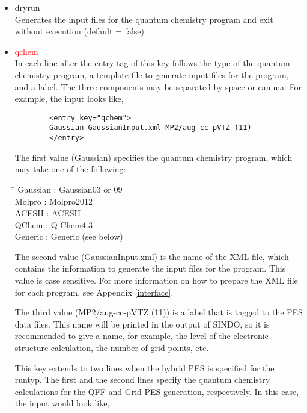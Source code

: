 \documentclass[a4paper,12pt]{article}
\begin{document}
\begin{itemize}
     \item dryrun \\
       Generates the input files for the quantum chemistry program and exit without execution (default = false) 
     \item \textcolor{red}{qchem} \\
       In each line after the entry tag of this key follows the type of the quantum chemistry program, a template 
       file to generate input files for the program, and a label. The three
       components may be separated by space or camma. For example, the input looks like,
       \begin{verbatim}
        <entry key="qchem">
        Gaussian GaussianInput.xml MP2/aug-cc-pVTZ (11)
        </entry> \end{verbatim}
       The first value (Gaussian) specifies the quantum chemistry program, which may take one of the following:
         \begin{tabbing}
           \hspace{20mm} \= \hspace{30mm} \kill
             Gaussian    \> : Gaussian03 or 09\\
             Molpro      \> : Molpro2012\\
             ACESII      \> : ACESII\\
             QChem       \> : Q-Chem4.3 \\
             Generic     \> : Generic (see below)
         \end{tabbing}      
       
       The second value (GaussianInput.xml) is the name of the XML file, which contains the information to generate the 
       input files for the program. This value is case sensitive. For more information on how to prepare the XML file 
       for each program, see Appendix \ref{interface}. 
       
       The third value (MP2/aug-cc-pVTZ (11)) is a label that is tagged to the PES data files. This name will be printed in the 
       output of SINDO, so it is recommended to give a name, for example, the level of the electronic structure calculation, the
       number of grid points, etc. 
       
       This key extends to two lines when the hybrid PES is specified for the
       runtyp. The first and the second lines specify the quantum chemistry
       calculations for the QFF and Grid PES generation, respectively. In this
       case, the input would look like,


\end{itemize}
\end{document}

